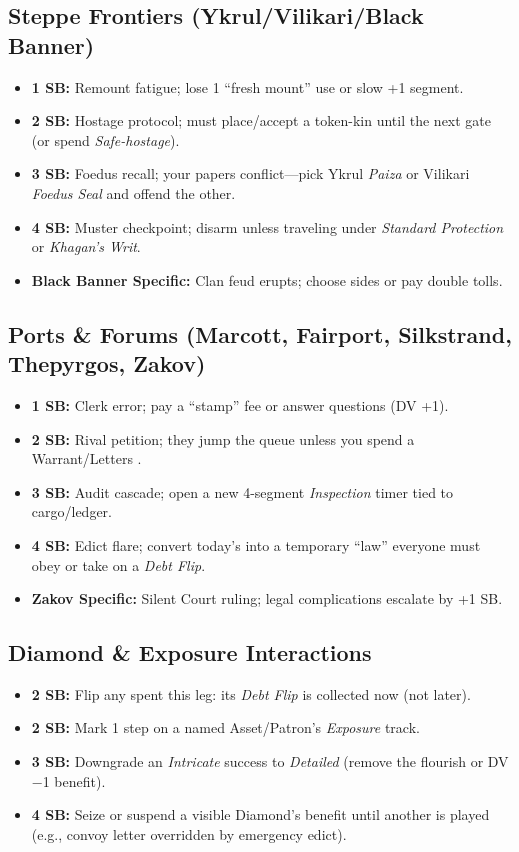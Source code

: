 \documentclass[11pt,letterpaper,twoside]{book}
\begin{document}
\subsection{Steppe Frontiers (Ykrul/Vilikari/Black Banner)}
\begin{itemize}
  \item \textbf{1 SB:} Remount fatigue; lose 1 ``fresh mount'' use or slow +1 segment.
  \item \textbf{2 SB:} Hostage protocol; must place/accept a token-kin until the next gate (or spend \emph{Safe-hostage}).
  \item \textbf{3 SB:} Foedus recall; your papers conflict---pick Ykrul \emph{Paiza} or Vilikari \emph{Foedus Seal} and offend the other.
  \item \textbf{4 SB:} Muster checkpoint; disarm unless traveling under \emph{Standard Protection} or \emph{Khagan's Writ}.
  \item \textbf{Black Banner Specific:} Clan feud erupts; choose sides or pay double tolls.
\end{itemize}

\subsection{Ports \& Forums (Marcott, Fairport, Silkstrand, Thepyrgos, Zakov)}
\begin{itemize}
  \item \textbf{1 SB:} Clerk error; pay a ``stamp'' fee or answer questions (DV +1).
  \item \textbf{2 SB:} Rival petition; they jump the queue unless you spend a Warrant/Letters \SuitDiamond{}.
  \item \textbf{3 SB:} Audit cascade; open a new 4-segment \emph{Inspection} timer tied to cargo/ledger.
  \item \textbf{4 SB:} Edict flare; convert today's \SuitClub{} into a temporary ``law'' everyone must obey or take on a \emph{Debt Flip}.
  \item \textbf{Zakov Specific:} Silent Court ruling; legal complications escalate by +1 SB.
\end{itemize}

\subsection{Diamond \& Exposure Interactions}
\begin{itemize}
  \item \textbf{2 SB:} Flip any \SuitDiamond{} spent this leg: its \emph{Debt Flip} is collected now (not later).
  \item \textbf{2 SB:} Mark 1 step on a named Asset/Patron's \emph{Exposure} track.
  \item \textbf{3 SB:} Downgrade an \emph{Intricate} success to \emph{Detailed} (remove the flourish or DV −1 benefit).
  \item \textbf{4 SB:} Seize or suspend a visible Diamond's benefit until another is played (e.g., convoy letter overridden by emergency edict).
\end{itemize}
\clearpage
\end{document}
